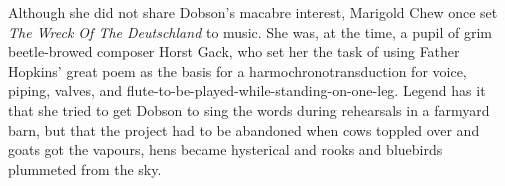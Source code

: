 Although she did not share Dobson's macabre interest, Marigold Chew once set \emph{The Wreck Of The Deutschland} to music. She was, at the time, a pupil of grim beetle-browed composer Horst Gack, who set her the task of using Father Hopkins' great poem as the basis for a harmochronotransduction for voice, piping, valves, and flute-to-be-played-while-standing-on-one-leg. Legend has it that she tried to get Dobson to sing the words during rehearsals in a farmyard barn, but that the project had to be abandoned when cows toppled over and goats got the vapours, hens became hysterical and rooks and bluebirds plummeted from the sky.

